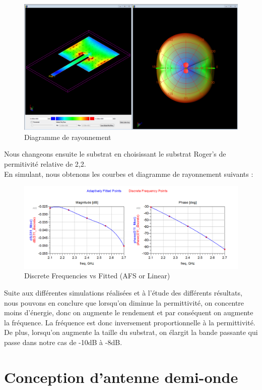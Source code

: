 \documentclass[16pt,a4paper,oneside,titlepage]{report}
\begin{document}
\begin{figure}[h]
\center
\includegraphics[scale=0.4]{Images/P3_Q10-2.png}
\caption{Diagramme de rayonnement}
\end{figure}

\clearpage
Nous changeons ensuite le substrat en choisissant le substrat Roger's de permitivité relative de 2,2.\\

En simulant, nous obtenons les courbes et diagramme de rayonnement suivants :
\begin{figure}[h]
\center
\includegraphics[scale=0.5]{Images/P3_Q11-1.png}
\caption{Discrete Frequencies vs Fitted (AFS or Linear)}
\end{figure}

Suite aux différentes simulations réalisées et à l'étude des différents résultats, nous pouvons en conclure que lorsqu'on diminue la permittivité, on concentre moins d'énergie, donc on augmente le rendement et par conséquent on augmente la fréquence. La fréquence est donc inversement proportionnelle à la permittivité.\\
De plus, lorsqu'on augmente la taille du substrat, on élargit la bande passante qui passe dans notre cas de -10dB à -8dB. 


\chapter{Conception d'antenne demi-onde}
\end{document}

